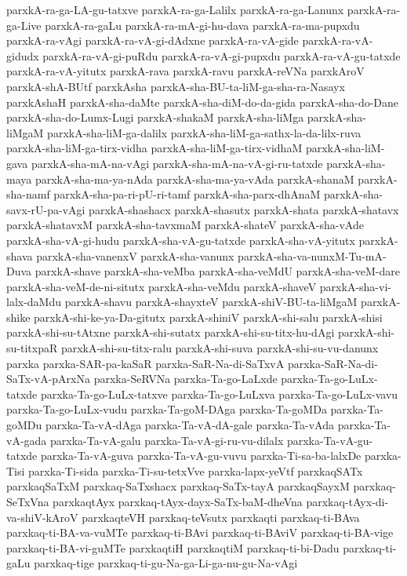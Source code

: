 {parxkA-ra-ga-LA-gu-tatxve
parxkA-ra-ga-Lalilx
parxkA-ra-ga-Lanunx
parxkA-ra-ga-Live
parxkA-ra-gaLu
parxkA-ra-mA-gi-hu-dava
parxkA-ra-ma-pupxdu
parxkA-ra-vAgi
parxkA-ra-vA-gi-dAdxne
parxkA-ra-vA-gide
parxkA-ra-vA-gidudx
parxkA-ra-vA-gi-puRdu
parxkA-ra-vA-gi-pupxdu
parxkA-ra-vA-gu-tatxde
parxkA-ra-vA-yitutx
parxkA-rava
parxkA-ravu
parxkA-reVNa
parxkAroV
parxkA-shA-BUtf
parxkAsha
parxkA-sha-BU-ta-liM-ga-sha-ra-Nasayx
parxkAshaH
parxkA-sha-daMte
parxkA-sha-diM-do-da-gida
parxkA-sha-do-Dane
parxkA-sha-do-Lumx-Lugi
parxkA-shakaM
parxkA-sha-liMga
parxkA-sha-liMgaM
parxkA-sha-liM-ga-dalilx
parxkA-sha-liM-ga-sathx-la-da-lilx-ruva
parxkA-sha-liM-ga-tirx-vidha
parxkA-sha-liM-ga-tirx-vidhaM
parxkA-sha-liM-gava
parxkA-sha-mA-na-vAgi
parxkA-sha-mA-na-vA-gi-ru-tatxde
parxkA-sha-maya
parxkA-sha-ma-ya-nAda
parxkA-sha-ma-ya-vAda
parxkA-shanaM
parxkA-sha-namf
parxkA-sha-pa-ri-pU-ri-tamf
parxkA-sha-parx-dhAnaM
parxkA-sha-savx-rU-pa-vAgi
parxkA-shashacx
parxkA-shasutx
parxkA-shata
parxkA-shatavx
parxkA-shatavxM
parxkA-sha-tavxmaM
parxkA-shateV
parxkA-sha-vAde
parxkA-sha-vA-gi-hudu
parxkA-sha-vA-gu-tatxde
parxkA-sha-vA-yitutx
parxkA-shava
parxkA-sha-vanenxV
parxkA-sha-vanunx
parxkA-sha-va-nunxM-Tu-mA-Duva
parxkA-shave
parxkA-sha-veMba
parxkA-sha-veMdU
parxkA-sha-veM-dare
parxkA-sha-veM-de-ni-situtx
parxkA-sha-veMdu
parxkA-shaveV
parxkA-sha-vi-lalx-daMdu
parxkA-shavu
parxkA-shayxteV
parxkA-shiV-BU-ta-liMgaM
parxkA-shike
parxkA-shi-ke-ya-Da-gitutx
parxkA-shiniV
parxkA-shi-salu
parxkA-shisi
parxkA-shi-su-tAtxne
parxkA-shi-sutatx
parxkA-shi-su-titx-hu-dAgi
parxkA-shi-su-titxpaR
parxkA-shi-su-titx-ralu
parxkA-shi-suva
parxkA-shi-su-vu-danunx
parxka
parxka-SAR-pa-kaSaR
parxka-SaR-Na-di-SaTxvA
parxka-SaR-Na-di-SaTx-vA-pArxNa
parxka-SeRVNa
parxka-Ta-go-LaLxde
parxka-Ta-go-LuLx-tatxde
parxka-Ta-go-LuLx-tatxve
parxka-Ta-go-LuLxva
parxka-Ta-go-LuLx-vavu
parxka-Ta-go-LuLx-vudu
parxka-Ta-goM-DAga
parxka-Ta-goMDa
parxka-Ta-goMDu
parxka-Ta-vA-dAga
parxka-Ta-vA-dA-gale
parxka-Ta-vAda
parxka-Ta-vA-gada
parxka-Ta-vA-galu
parxka-Ta-vA-gi-ru-vu-dilalx
parxka-Ta-vA-gu-tatxde
parxka-Ta-vA-guva
parxka-Ta-vA-gu-vuvu
parxka-Ti-sa-ba-lalxDe
parxka-Tisi
parxka-Ti-sida
parxka-Ti-su-tetxVve
parxka-lapx-yeVtf
parxkaqSATx
parxkaqSaTxM
parxkaq-SaTxshacx
parxkaq-SaTx-tayA
parxkaqSayxM
parxkaq-SeTxVna
parxkaqtAyx
parxkaq-tAyx-dayx-SaTx-baM-dheVna
parxkaq-tAyx-di-va-shiV-kAroV
parxkaqteVH
parxkaq-teVsutx
parxkaqti
parxkaq-ti-BAva
parxkaq-ti-BA-va-vuMTe
parxkaq-ti-BAvi
parxkaq-ti-BAviV
parxkaq-ti-BA-vige
parxkaq-ti-BA-vi-guMTe
parxkaqtiH
parxkaqtiM
parxkaq-ti-bi-Dadu
parxkaq-ti-gaLu
parxkaq-tige
parxkaq-ti-gu-Na-ga-Li-ga-nu-gu-Na-vAgi
}
